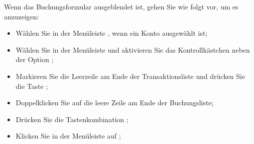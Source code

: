\vspace{2mm}
Wenn das Buchungsformular ausgeblendet ist, gehen Sie wie folgt vor, um es anzuzeigen:
\begin{itemize}
	\item Wählen Sie in der Menüleiste , wenn ein Konto ausgewählt ist;
	\item Wählen Sie in der Menüleiste  und aktivieren Sie das Kontrollkästchen neben der Option ;
	\item Markieren Sie die Leerzeile am Ende der Transaktionsliste und drücken Sie die Taste ;
	\item Doppelklicken Sie auf die leere Zeile am Ende der Buchungsliste;
	\item Drücken Sie die Tastenkombination ;
	\item Klicken Sie in der Menüleiste auf ;

\end{itemize}
